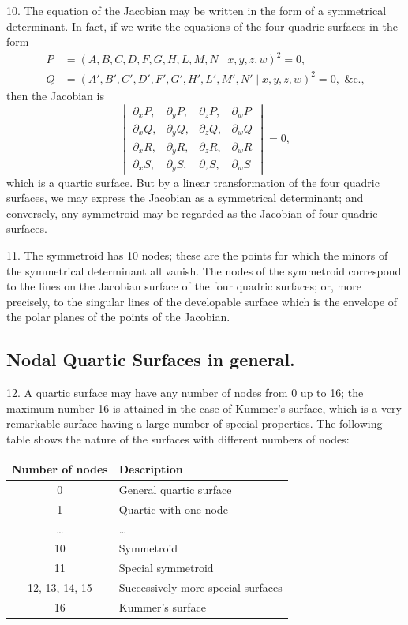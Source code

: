 \documentclass[11pt,a4paper]{article}
\begin{document}
10. The equation of the Jacobian may be written in the form of a symmetrical determinant. In fact, if we write the equations of the four quadric surfaces in the form
\begin{align*}
P &= (A, B, C, D, F, G, H, L, M, N \mid x, y, z, w)^2 = 0, \\
Q &= (A', B', C', D', F', G', H', L', M', N' \mid x, y, z, w)^2 = 0, \text{ \&c.,}
\end{align*}
then the Jacobian is
\[
\begin{vmatrix}
\partial_x P, & \partial_y P, & \partial_z P, & \partial_w P \\
\partial_x Q, & \partial_y Q, & \partial_z Q, & \partial_w Q \\
\partial_x R, & \partial_y R, & \partial_z R, & \partial_w R \\
\partial_x S, & \partial_y S, & \partial_z S, & \partial_w S
\end{vmatrix} = 0,
\]
which is a quartic surface. But by a linear transformation of the four quadric surfaces, we may express the Jacobian as a symmetrical determinant; and conversely, any symmetroid may be regarded as the Jacobian of four quadric surfaces.

11. The symmetroid has 10 nodes; these are the points for which the minors of the symmetrical determinant all vanish. The nodes of the symmetroid correspond to the lines on the Jacobian surface of the four quadric surfaces; or, more precisely, to the singular lines of the developable surface which is the envelope of the polar planes of the points of the Jacobian.

\subsection*{Nodal Quartic Surfaces in general.}

12. A quartic surface may have any number of nodes from 0 up to 16; the maximum number 16 is attained in the case of Kummer's surface, which is a very remarkable surface having a large number of special properties. The following table shows the nature of the surfaces with different numbers of nodes:
\begin{center}
\begin{tabular}{cl}
\toprule
Number of nodes & Description \\
\midrule
0 & General quartic surface \\
1 & Quartic with one node \\
\ldots & \ldots \\
10 & Symmetroid \\
11 & Special symmetroid \\
12, 13, 14, 15 & Successively more special surfaces \\
16 & Kummer's surface \\
\bottomrule
\end{tabular}
\end{center}
\end{document}
